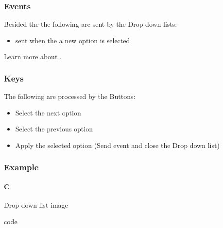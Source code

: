 \documentclass[letterpaper,10pt,english]{sphinxmanual}
\begin{document}
\subsubsection{Events}
\label{\detokenize{object-types/ddlist:events}}
Besided the  the following  are sent by the Drop down lists:
\begin{itemize}
\item {} 
 sent when the a new option is selected

\end{itemize}

Learn more about {\hyperref[\detokenize{overview/events::doc}]{}}.


\subsubsection{Keys}
\label{\detokenize{object-types/ddlist:keys}}
The following  are processed by the Buttons:
\begin{itemize}
\item {} 
 Select the next option

\item {} 
 Select the previous option

\item {} 
 Apply the selected option (Send  event and close the Drop down list)

\end{itemize}


\subsubsection{Example}
\label{\detokenize{object-types/ddlist:example}}

\paragraph{C}
\label{\detokenize{object-types/ddlist:c}}
Drop down list image

code
\end{document}
